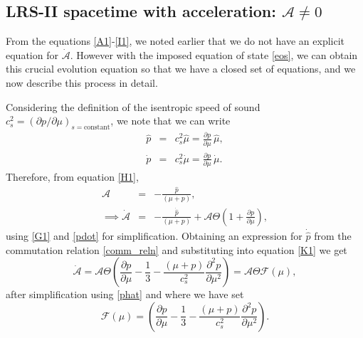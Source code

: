 \documentclass[abstract=on,notitlepage,superscriptaddress,nofootinbib,aps,preprint,prd]{revtex4}
\newcommand{\0}{^{(0)}}
\newcommand{\1}{^{(1)}}
\newcommand{\2}{^{(2)}}
\newcommand{\3}{{}^{(3)}}
\begin{document}
\subsection{LRS-II spacetime with acceleration: $\mathcal{A} \neq 0$}
From the equations \eqref{A1}-\eqref{I1}, we noted earlier that we do not have an explicit equation for  $\dot{\mathcal{A}}$. However with the imposed equation of state \eqref{eos}, we can obtain this crucial evolution equation so that we have a closed set of equations, and we now describe this process in detail. 

Considering the definition of the isentropic speed of sound $c_s^2 = \left(\partial p/ \partial \mu\right)_{s = \text{constant}}$, we note that we can write
\begin{eqnarray}
\hat{p} &=& c_s^2 \hat{\mu} = \frac{\partial p}{\partial \mu}\,\hat{\mu},\\ \label{phat}
 \dot{p} &=& c_s^2\dot{\mu} =\frac{\partial p}{\partial \mu}\,\dot{\mu} . \label{pdot}
\end{eqnarray}
Therefore, from equation \eqref{H1},
\begin{eqnarray}
	  \mathcal{A} &=& -\frac{\hat{p}}{(\mu+p)},\nonumber \\
	\implies \dot{\mathcal{A}} &=& -\frac{\dot{\hat{p}}}{(\mu+p)}+\mathcal{A}\Theta\left(1+\frac{\partial p}{\partial \mu}\right), \label{K1}
\end{eqnarray}
using  \eqref{G1}  and \eqref{pdot} for simplification. Obtaining an expression for $\dot{\hat{p}}$ from the commutation relation \eqref{comm_reln} and substituting into equation \eqref{K1} we get
\begin{equation}
	\dot{\mathcal{A}}=\mathcal{A}\Theta\left(\frac{\partial p}{\partial \mu}-\frac{1}{3}-\frac{(\mu+p)}{c_s^2}\frac{\partial^2 p}{\partial \mu^2}\right)=\mathcal{A}\Theta\mathcal{F}(\mu),\label{K}
\end{equation}
after simplification using \eqref{phat} and where we have set
\begin{equation}
\mathcal{F}(\mu) = \left(\frac{\partial p}{\partial \mu}-\frac{1}{3}-\frac{(\mu+p)}{c_s^2}\frac{\partial^2 p}{\partial \mu^2}\right).
\end{equation}
\end{document}
